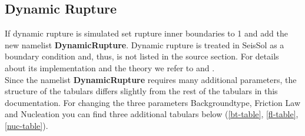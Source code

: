 \documentclass[12pt,twoside]{article}
\begin{document}
\subsection{Dynamic Rupture}
\noindent
If \hypertarget{dynrupture}{dynamic rupture} is simulated set rupture inner boundaries to 1 
and add the new namelist \textbf{DynamicRupture}.
Dynamic rupture is treated in SeisSol as a boundary condition and, thus, is not listed in the source section.
For details about its implementation and the theory we refer to \cite{Pelties12} and \cite{Pelties14}.
\\

\noindent
Since the namelist \textbf{DynamicRupture} requires many additional parameters, 
the structure of the tabulars differs slightly from the rest of the tabulars in this documentation.
For changing the three parameters Backgroundtype, Friction Law and Nucleation 
you can find three additional tabulars below (\ref{bt-table}, \ref{fl-table},
 \ref{nuc-table}).

\newpage 
\end{document}
